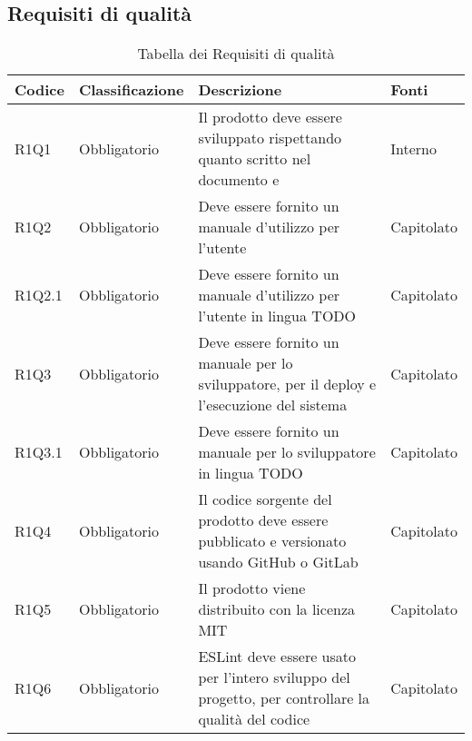 \subsection{Requisiti di qualità}

{


\centering
\renewcommand{\arraystretch}{2}
\begin{longtable}{C{2.5cm} C{2.8cm} C{6.7cm} C{2.5cm}}
\caption{Tabella dei Requisiti di qualità}\\
\textbf{Codice} &
\textbf{Classificazione}&
\textbf{Descrizione}&
\textbf{Fonti}\\
\endhead


R1Q1 & Obbligatorio & Il prodotto deve essere sviluppato rispettando quanto scritto nel documento  e  & Interno \\
R1Q2 & Obbligatorio & Deve essere fornito un manuale d'utilizzo per l'utente & Capitolato \\
R1Q2.1 & Obbligatorio & Deve essere fornito un manuale d'utilizzo per l'utente in lingua TODO & Capitolato \\
R1Q3 & Obbligatorio & Deve essere fornito un manuale per lo sviluppatore, per il deploy e l'esecuzione del sistema & Capitolato \\
R1Q3.1 & Obbligatorio & Deve essere fornito un manuale per lo sviluppatore in lingua TODO & Capitolato \\
R1Q4 & Obbligatorio & Il codice sorgente del prodotto deve essere pubblicato e versionato usando GitHub o GitLab & Capitolato \\
R1Q5 & Obbligatorio & Il prodotto viene distribuito con la licenza MIT & Capitolato \\
R1Q6 & Obbligatorio & ESLint deve essere usato per l'intero sviluppo del progetto, per controllare la qualità del codice & Capitolato \\

\end{longtable}

}